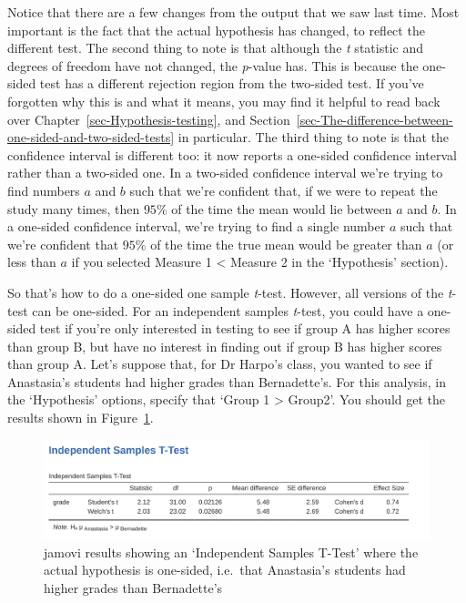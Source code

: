 \documentclass[
  a4paper,
]{book}
\begin{document}
Notice that there are a few changes from the output that we saw last
time. Most important is the fact that the actual hypothesis has changed,
to reflect the different test. The second thing to note is that although
the \emph{t} statistic and degrees of freedom have not changed, the
\emph{p}-value has. This is because the one-sided test has a different
rejection region from the two-sided test. If you've forgotten why this
is and what it means, you may find it helpful to read back over
Chapter~\ref{sec-Hypothesis-testing}, and
Section~\ref{sec-The-difference-between-one-sided-and-two-sided-tests}
in particular. The third thing to note is that the confidence interval
is different too: it now reports a one-sided confidence interval rather
than a two-sided one. In a two-sided confidence interval we're trying to
find numbers \(a\) and \(b\) such that we're confident that, if we were
to repeat the study many times, then \(95\%\) of the time the mean would
lie between \(a\) and \(b\). In a one-sided confidence interval, we're
trying to find a single number \(a\) such that we're confident that
\(95\%\) of the time the true mean would be greater than \(a\) (or less
than \(a\) if you selected Measure 1 \textless{} Measure 2 in the
`Hypothesis' section).

So that's how to do a one-sided one sample \emph{t}-test. However, all
versions of the \emph{t}-test can be one-sided. For an independent
samples \emph{t}-test, you could have a one-sided test if you're only
interested in testing to see if group A has higher scores than group B,
but have no interest in finding out if group B has higher scores than
group A. Let's suppose that, for Dr Harpo's class, you wanted to see if
Anastasia's students had higher grades than Bernadette's. For this
analysis, in the `Hypothesis' options, specify that `Group 1
\textgreater{} Group2'. You should get the results shown in
Figure~\ref{fig-fig11-18}.

\begin{figure}

\includegraphics[width=1\textwidth,height=\textheight]{images/fig11-18.png} \hfill{}

\caption{\label{fig-fig11-18}jamovi results showing an `Independent
Samples T-Test' where the actual hypothesis is one-sided, i.e.~that
Anastasia's students had higher grades than Bernadette's}

\end{figure}
\end{document}
